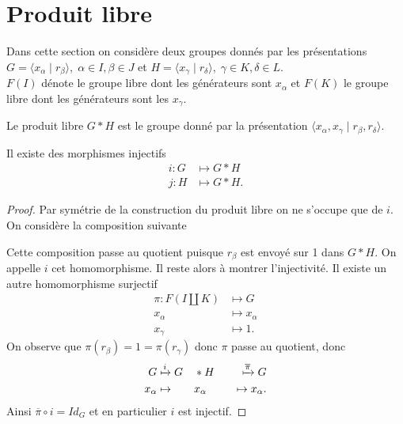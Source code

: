 \documentclass[main.tex]{subfiles}
\begin{document}
	\section{Produit libre}
	Dans cette section on considère deux groupes donnés par les présentations $G = \langle x_{\alpha} \;|\; r_{\beta} \rangle, \; \alpha \in I, \beta \in J$ et $H = \langle x_{\gamma} \;|\; r_{\delta} \rangle, \; \gamma \in K, \delta \in L$. \\
	$F(I)$ dénote le groupe libre dont les générateurs sont $x_{\alpha}$ et $F(K)$ le groupe libre dont les générateurs sont les $x_{\gamma}$.

	\begin{definition}
		Le produit libre $G * H$ est le groupe donné par la présentation $\langle x_{\alpha}, x_{\gamma} \;|\; r_{\beta},r_{\delta} \rangle$.
	\end{definition}
	\begin{lemma}
		Il existe des morphismes injectifs
		\begin{align*}
			i : G &\longmapsto G*H \\
			j : H &\longmapsto G*H
		.\end{align*}
	\end{lemma}
	\begin{proof}
		Par symétrie de la construction du produit libre on ne s'occupe que de $i$. On considère la composition suivante
		\medskip

		\medskip

		Cette composition passe au quotient puisque $r_{\beta}$ est envoyé sur 1 dans $G*H$. On appelle $i$ cet homomorphisme. Il reste alors à montrer l'injectivité.
		Il existe un autre homomorphisme surjectif 
		\begin{align*}
		\pi :	F(I\amalg K) &\longmapsto G \\
			x_{\alpha} &\longmapsto x_{\alpha} \\
			x_{\gamma} &\longmapsto 1
		.\end{align*}
		On observe que $\pi(r_{\beta}) = 1 = \pi(r_{\gamma})$ donc $\pi$ passe au quotient, donc 
		\begin{alignat*}{4}
			G &\xmapsto{i} G&&*H &&&\xmapsto{\overline{\pi}} G \\
			x_{\alpha} &\mapsto &&x_{\alpha} &&&\mapsto x_{\alpha}
		.\end{alignat*}
		Ainsi $\overline{\pi} \circ i = Id_G$ et en particulier $i$ est injectif.
	\end{proof}
\end{document}
